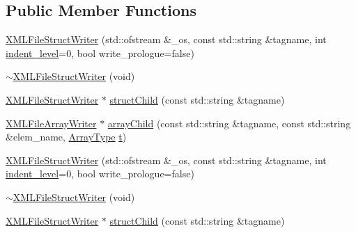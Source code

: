 \subsection*{Public Member Functions}
\begin{DoxyCompactItemize}
\item 
\mbox{\hyperlink{classXMLStructWriterAPI_1_1XMLFileStructWriter_a7045796a887cf66a8ee5a355a1f3c4a9}{X\+M\+L\+File\+Struct\+Writer}} (std\+::ofstream \&\+\_\+os, const std\+::string \&tagname, int \mbox{\hyperlink{classXMLStructWriterAPI_1_1XMLStructWriterBase_ac592a077855a1377b390f4abff506e38}{indent\+\_\+level}}=0, bool write\+\_\+prologue=false)
\item 
\mbox{\hyperlink{classXMLStructWriterAPI_1_1XMLFileStructWriter_a28ac83ac02b6b4e4e67f9a767320155d}{$\sim$\+X\+M\+L\+File\+Struct\+Writer}} (void)
\item 
\mbox{\hyperlink{classXMLStructWriterAPI_1_1XMLFileStructWriter}{X\+M\+L\+File\+Struct\+Writer}} $\ast$ \mbox{\hyperlink{classXMLStructWriterAPI_1_1XMLFileStructWriter_a29ff0f4353991294bab0c75ab8895f73}{struct\+Child}} (const std\+::string \&tagname)
\item 
\mbox{\hyperlink{classXMLStructWriterAPI_1_1XMLFileArrayWriter}{X\+M\+L\+File\+Array\+Writer}} $\ast$ \mbox{\hyperlink{classXMLStructWriterAPI_1_1XMLFileStructWriter_a45906f3eaab392974dde2da7cf1fef05}{array\+Child}} (const std\+::string \&tagname, const std\+::string \&elem\+\_\+name, \mbox{\hyperlink{namespaceXMLStructWriterAPI_a2017208be87c77a32bdc19ea2f14d032}{Array\+Type}} \mbox{\hyperlink{adat__devel_2lib_2hadron_2hadron__timeslice_8cc_ac310d9181e916ba43604099aee272c71}{t}})
\item 
\mbox{\hyperlink{classXMLStructWriterAPI_1_1XMLFileStructWriter_a7045796a887cf66a8ee5a355a1f3c4a9}{X\+M\+L\+File\+Struct\+Writer}} (std\+::ofstream \&\+\_\+os, const std\+::string \&tagname, int \mbox{\hyperlink{classXMLStructWriterAPI_1_1XMLStructWriterBase_ac592a077855a1377b390f4abff506e38}{indent\+\_\+level}}=0, bool write\+\_\+prologue=false)
\item 
\mbox{\hyperlink{classXMLStructWriterAPI_1_1XMLFileStructWriter_a28ac83ac02b6b4e4e67f9a767320155d}{$\sim$\+X\+M\+L\+File\+Struct\+Writer}} (void)
\item 
\mbox{\hyperlink{classXMLStructWriterAPI_1_1XMLFileStructWriter}{X\+M\+L\+File\+Struct\+Writer}} $\ast$ \mbox{\hyperlink{classXMLStructWriterAPI_1_1XMLFileStructWriter_a29ff0f4353991294bab0c75ab8895f73}{struct\+Child}} (const std\+::string \&tagname)
\item 

\end{DoxyCompactItemize}

